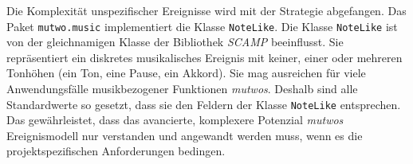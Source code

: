 \documentclass[12pt,a4paper,ngerman]{article}
\begin{document}
\vspace{1.25cm}


\hspace{-0.4cm}

\newpage

Die Komplexität unspezifischer Ereignisse wird mit der Strategie  abgefangen.
Das Paket \texttt{mutwo.music} implementiert die Klasse \texttt{NoteLike}.
Die Klasse \texttt{NoteLike} ist von der gleichnamigen Klasse der Bibliothek \emph{SCAMP} beeinflusst.
Sie repräsentiert ein diskretes musikalisches Ereignis mit keiner, einer oder mehreren Tonhöhen (ein Ton, eine Pause, ein Akkord).
Sie mag ausreichen für viele Anwendungsfälle musikbezogener Funktionen \emph{mutwos}.
Deshalb sind alle Standardwerte so gesetzt, dass sie den Feldern der Klasse \texttt{NoteLike} entsprechen.
Das gewährleistet, dass das avancierte, komplexere Potenzial \emph{mutwos} Ereignismodell nur verstanden und angewandt werden muss, wenn es die projektspezifischen Anforderungen bedingen.


%
\end{document}
